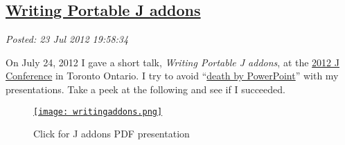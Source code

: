 %

\subsection*{\href{https://bakerjd99.wordpress.com/2012/07/23/writing-portable-j-addons/}{Writing Portable J addons}}


\noindent\emph{Posted: 23 Jul 2012 19:58:34}
\vspace{6pt}

On July 24, 2012 I gave a short talk, \emph{Writing Portable J addons},
at the
\href{http://www.jsoftware.com/jwiki/Community/Conference2012}{2012 J
Conference} in Toronto Ontario. I try to avoid
``\href{http://www.slideshare.net/thecroaker/death-by-powerpoint}{death
by PowerPoint}'' with my presentations. Take a peek at the following and
see if I succeeded.



\captionsetup[figure]{labelformat=empty}
\begin{figure}[htbp]
\centering
\href{https://github.com/bakerjd99/jacks/blob/master/dogpony/WritingPortableJaddons.pdf}{\texttt{[image: writingaddons.png]}}
\caption{Click for J addons PDF presentation}
\label{fig:3059X0}
\end{figure}



%